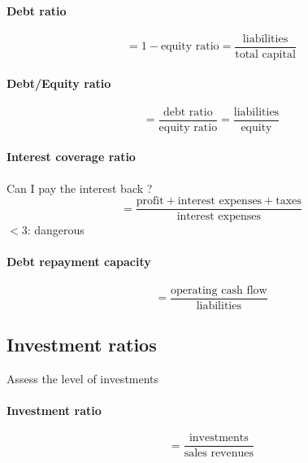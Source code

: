 \documentclass[a4paper] {scrartcl}
\begin{document}
\paragraph{Debt ratio} %
\label{par:debt_ratio}
\begin{equation}
	= 1-\text{equity ratio}
	= \frac{\text{liabilities}}{\text{total capital}}
\end{equation}

\paragraph{Debt/Equity ratio} %
\label{par:debt_equity_ratio}
\begin{equation}
	= \frac{\text{debt ratio}}{\text{equity ratio}}
	= \frac{\text{liabilities}}{\text{equity}}
\end{equation}

\paragraph{Interest coverage ratio} %
\label{par:interest_coverage_ratio}
Can I pay the interest back ?
\begin{equation}
	= \frac{\text{profit}+\text{interest expenses}+\text{taxes}}{\text{interest expenses}}
\end{equation}
$<3$: dangerous

\paragraph{Debt repayment capacity} %
\label{par:repayment_capacity}
\begin{equation}
	= \frac{\text{operating cash flow}}{\text{liabilities}}
\end{equation}



\subsection{Investment ratios} %
\label{sub:investment_ratios}
Assess the level of investments

\paragraph{Investment ratio} %
\label{par:investment_ratio}
\begin{equation}
	= \frac{\text{investments}}{\text{sales revenues}}
\end{equation}
\end{document}

